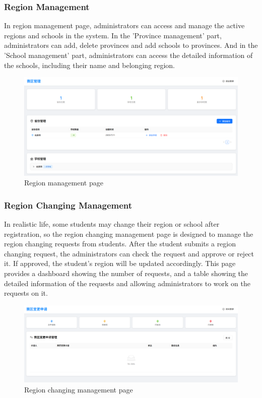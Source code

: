 \documentclass[12pt]{article}
\begin{document}
\subsubsection{Region Management}
In region management page, administrators can access and manage the active regions and schools in the system. In the 'Province management'
part, administrators can add, delete provinces and add schools to provinces. And in the 'School management' part, administrators can
access the detailed information of the schools, including their name and belonging region.
\begin{figure}[H]
    \centering
    \includegraphics[width=\textwidth]{admin/region-overview.png}
    \caption{Region management page}
    \label{fig:RegionManagement page}
\end{figure}
\subsubsection{Region Changing Management}
In realistic life, some students may change their region or school after registration, so the region changing management page is designed to
manage the region changing requests from students. After the student submits a region changing request,
the administrators can check the request and approve or reject it. If approved, the student's region will be updated accordingly.
This page provides a dashboard showing the number of requests, and a table showing the detailed information of the requests
and allowing administrators to work on the requests on it.
\begin{figure}[H]
    \centering
    \includegraphics[width=\textwidth]{admin/changeregion.png}
    \caption{Region changing management page}
    \label{fig:RegionChangingManagement page}
\end{figure}
\end{document}
